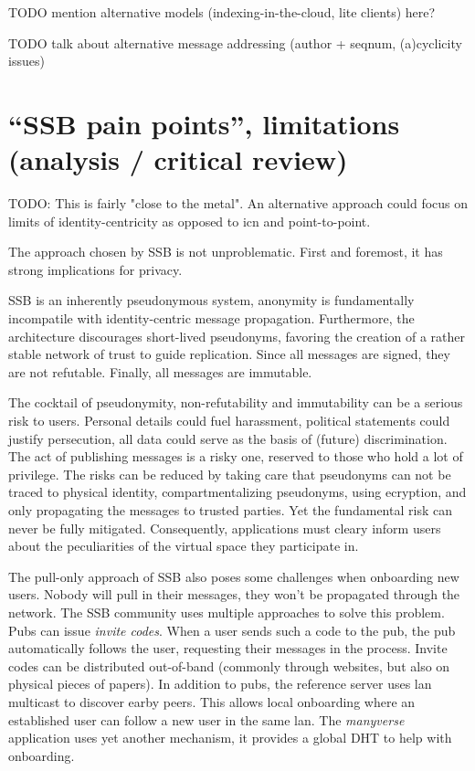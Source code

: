 \documentclass[sigconf]{acmart}
\begin{document}
TODO mention alternative models (indexing-in-the-cloud, lite clients) here?

TODO talk about alternative message addressing (author + seqnum, (a)cyclicity issues)

\section{``SSB pain points'', limitations (analysis / critical review)}

TODO: This is fairly "close to the metal". An alternative approach could focus on limits of identity-centricity as opposed to icn and point-to-point.

The approach chosen by SSB is not unproblematic. First and foremost, it has strong implications for privacy.

SSB is an inherently pseudonymous system, anonymity is fundamentally incompatile with identity-centric message propagation. Furthermore, the architecture discourages short-lived pseudonyms, favoring the creation of a rather stable network of trust to guide replication. Since all messages are signed, they are not refutable. Finally, all messages are immutable.

The cocktail of pseudonymity, non-refutability and immutability can be a serious risk to users. Personal details could fuel harassment, political statements could justify persecution, all data could serve as the basis of (future) discrimination. The act of publishing messages is a risky one, reserved to those who hold a lot of privilege. The risks can be reduced by taking care that pseudonyms can not be traced to physical identity, compartmentalizing pseudonyms, using ecryption, and only propagating the messages to trusted parties. Yet the fundamental risk can never be fully mitigated. Consequently, applications must cleary inform users about the peculiarities of the virtual space they participate in.

The pull-only approach of SSB also poses some challenges when onboarding new users. Nobody will pull in their messages, they won't be propagated through the network. The SSB community uses multiple approaches to solve this problem. Pubs can issue \textit{invite codes}. When a user sends such a code to the pub, the pub automatically follows the user, requesting their messages in the process. Invite codes can be distributed out-of-band (commonly through websites, but also on physical pieces of papers). In addition to pubs, the reference server uses lan multicast to discover earby peers. This allows local onboarding where an established user can follow a new user in the same lan. The \textit{manyverse} application uses yet another mechanism, it provides a global DHT to help with onboarding.
\end{document}
